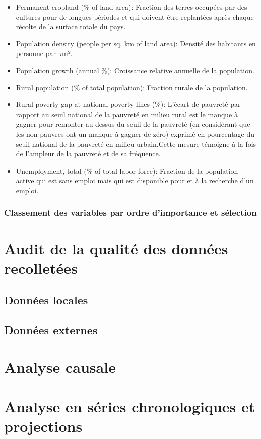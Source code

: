 \begin{itemize}
	\item Permanent cropland (\% of land area): Fraction des terres occupées par des cultures pour de longues périodes et qui doivent être replantées après chaque récolte de la surface totale du pays.
	\item Population density (people per sq. km of land area): Densité des habitants en personne par km².
	\item Population growth (annual \%): Croissance relative annuelle de la population.
	\item Rural population (\% of total population): Fraction rurale de la population.
	\item Rural poverty gap at national poverty lines (\%): L'écart de pauvreté par rapport au seuil national de la pauvreté en milieu rural est le manque à gagner pour remonter au-dessus du seuil de la pauvreté (en considérant que les non pauvres ont un manque à gagner de zéro) exprimé en pourcentage du seuil national de la pauvreté en milieu urbain.Cette mesure témoigne à la fois de l'ampleur de la pauvreté et de sa fréquence.
	\item Unemployment, total (\% of total labor force): Fraction de la population active qui est sans emploi mais qui est disponible pour et à la recherche d'un emploi.
	\end{itemize}
	\subsubsection{Classement des variables par ordre d'importance et sélection}
	\section{Audit de la qualité des données recolletées}
	\subsection{Données locales}
	\subsection{Données externes}
	\section{Analyse causale}
	\section{Analyse en séries chronologiques et projections}